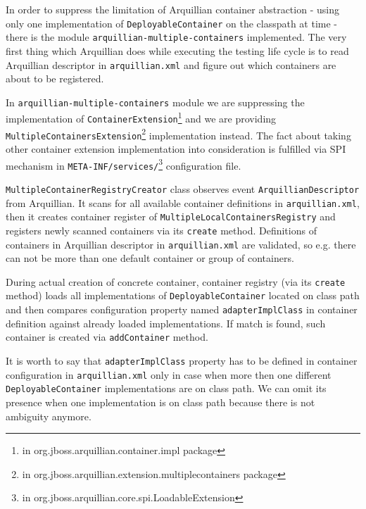\documentclass[12pt,final,oneside]{fithesis}
\begin{document}
In order to suppress the limitation of Arquillian container abstraction - using only one implementation of \texttt{DeployableContainer} on the classpath at time \cite{bib110}- there is the module \texttt{arquillian-multiple-containers} implemented. The very first thing which Arquillian does while executing the testing life cycle is to read Arquillian descriptor in \texttt{arquillian.xml} and figure out which containers are about to be registered.

In \texttt{arquillian-multiple-containers} module we are suppressing the implementation of \texttt{ContainerExtension}\footnote{in org.jboss.arquillian.container.impl package} and we are providing \texttt{MultipleContainersExtension}\footnote{in org.jboss.arquillian.extension.multiplecontainers package} implementation instead. The fact \linebreak about taking other container extension implementation into consideration is fulfilled via SPI mechanism in \texttt{META-INF/services/}\footnote{in org.jboss.arquillian.core.spi.LoadableExtension} configuration file. 

\texttt{MultipleContainerRegistryCreator} class observes event \linebreak \texttt{ArquillianDescriptor} from Arquillian. It scans for all available container definitions in \texttt{arquillian.xml}, then it creates container register of \texttt{MultipleLocalContainersRegistry} and registers newly scanned containers via its \texttt{create} method. Definitions of containers in Arquillian descriptor in \texttt{arquillian.xml} are validated, so e.g. there can not be more than one default container or group of containers.

During actual creation of concrete container, container registry (via its \texttt{create} method) loads all implementations of \texttt{DeployableContainer} located on class path and then compares configuration property named \texttt{adapterImplClass} in container definition against already loaded implementations. If match is found, such container is created via \linebreak \texttt{addContainer} method.

It is worth to say that \texttt{adapterImplClass} property has to be defined in container configuration in \texttt{arquillian.xml} only in case when more then one different \texttt{DeployableContainer} implementations are on class path. We can omit its presence when one implementation is on class path because there is not ambiguity anymore. 
\end{document}
